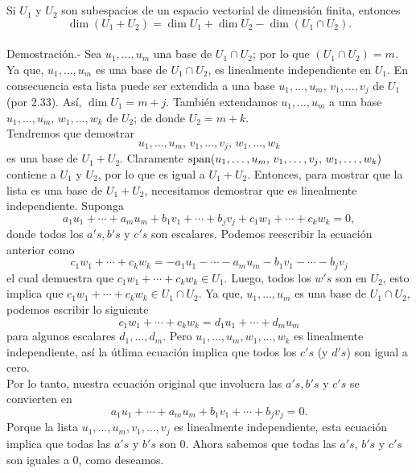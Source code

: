 \begin{myteo}\,\\\\
    Si $U_1$ y $U_2$ son subespacios de un espacio vectorial de dimensión finita, entonces
    $$\dim(U_1+U_2)=\dim U_1+\dim U_2 - \dim(U_1\cap U_2).$$\\
	Demostración.-\; Sea $u_1,\ldots,u_m$ una base de $U_1\cap U_2$; por lo que $(U_1\cap U_2)=m$. Ya que, $u_1,\ldots,u_m$ es una base de $U_1\cap U_2$, es linealmente independiente en $U_1$. En consecuencia esta lista puede ser extendida a una base $u_1,\ldots,u_m,\, v_1,\ldots,v_j$ de $U_1$ (por 2.33). Así, $\dim U_1=m+j$. También extendamos $u_1,\ldots,u_m$ a una base $u_1,\ldots,u_m,\, w_1,\ldots,w_k$ de $U_2$; de donde $U_2=m+k$.\\
	Tendremos que demostrar
	$$u_1,\ldots,u_m,\, v_1,\ldots,v_j,\,w_1,\ldots,w_k$$
	es una base de $U_1+U_2$. Claramente $\mathop{\mbox{\normalfont span}}\nolimits(u_1,\ldots,u_m,\, v_1,\ldots,v_j,\,w_1,\ldots,w_k)$ contiene a $U_1$ y $U_2$, por lo que es igual a $U_1+U_2$. Entonces, para mostrar que la lista es una base de $U_1+U_2$, necesitamos demostrar que es linealmente independiente. Suponga
	$$a_1u_1+\cdots+a_mu_m+b_1v_1+\cdots+b_jv_j+c_1w_1+\cdots+c_kw_k=0,$$
	donde todos los $a's,b's$ y $c's$ son escalares. Podemos reescribir la ecuación anterior como
	$$c_1w_1+\cdots+c_kw_k=-a_1u_1-\cdots-a_mu_m-b_1v_1-\cdots-b_jv_j$$
	el cual demuestra que $c_1w_1+\cdots+c_kw_k\in U_1$. Luego, todos los $w's$ son en $U_2$, esto implica que $c_1w_1+\cdots+c_kw_k\in U_1\cap U_2$. Ya que, $u_1,\ldots,u_m$ es una base de $U_1\cap U_2$, podemos escribir lo siguiente
	$$c_1w_1+\cdots+c_kw_k=d_1u_1+\cdots+d_m u_m$$
	para algunos escalares $d_1,\ldots,d_m$. Pero $u_1,\ldots,u_m,w_1,\ldots,w_k$ es linealmente independiente, así la útlima ecuación implica que todos los $c's$ (y $d's$) son igual a cero. \\
	
	Por lo tanto, nuestra ecuación original que involucra las $a's, b's$ y $c's$ se convierten en 
	$$a_1u_1+\cdots+a_mu_m+b_1v_1+\cdots+b_jv_j=0.$$
	Porque la lista $u_1,\ldots, u_m, v_1, \ldots, v_j$ es linealmente independiente, esta ecuación implica que todas las $a's$ y $b's$ son $0$. Ahora sabemos que todas las $a's$, $b's$ y $c's$ son iguales a $0$, como deseamos.
\end{myteo}
\vspace{.5cm}

\setcounter{mysection}{2}


